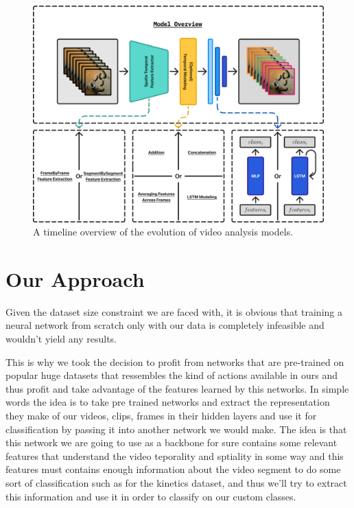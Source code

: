 \begin{figure}[t]
    \centering
    \includegraphics[width=\textwidth]{../../assets/figures/model-overview-v1.png}
    \caption{A timeline overview of the evolution of video analysis models.}
    \label{fig:your-label}
\end{figure}

\section{Our Approach}

Given the dataset size constraint we are faced with, it is obvious that training a neural network from scratch only with our data is completely infeasible and wouldn't yield any results.

This is why we took the decision to profit from networks that are pre-trained on popular huge datasets that ressembles the kind of actions available in ours and thus profit and take advantage of the features learned by this networks. In simple words the idea is to take pre trained networks and extract the representation they make of our videos, clips, frames in their hidden layers and use it for classification by passing it into another network we would make.
The idea is that this network we are going to use as a backbone for sure contains some relevant features that understand the video teporality and sptiality in some way and this features must contains enough information about the video segment to do some sort of classification such as for the kinetics dataset, and thus we'll try to extract this information and use it in order to classify on our custom classes. 

